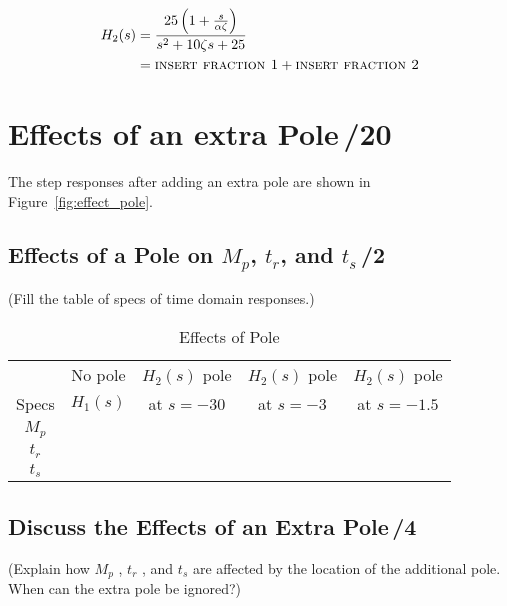 \documentclass{article}
\newcommand{\score}{\hfill \underline{\hspace{0.65cm}}\,/} %
\begin{document}
\begin{align*}
H_2(s) &=\frac{25 \left( 1+\frac{s}{\alpha \zeta} \right)}{s^2+10\zeta s +25}\\
       &= \mbox{\sc insert fraction 1} + \mbox{\sc insert fraction 2}
\end{align*}

\section{{\sc Effects of an extra Pole}\score 20}
The step responses after adding an extra pole are shown in Figure~\ref{fig:effect_pole}.

\subsection{Effects of a Pole on $M_p$, $t_r$, and $t_s$\score 2}
(Fill the table of specs of time domain responses.)
\begin{table}[phtb] \label{tbl:lab2_q3}
\begin{center}
\caption{Effects of Pole}
\begin{tabular}{c|c|c|c|c} \hline \hline
\rowcolor{Grey} & No pole & $H_2(s)$ pole & $H_2(s)$ pole & $H_2(s)$ pole \\
\rowcolor{Grey} Specs &  $H_1(s)$ &  at $s = -30$ &  at $s = -3$ & at $s = -1.5$ \\ \hline   
$M_p$ &  &  &  &  \\ \hline
$t_r$ &  &  &  &  \\ \hline
$t_s$ &  &  &  &  \\ \hline
\end{tabular}
\end{center}
\end{table}

\subsection{Discuss the Effects of an Extra Pole\score 4}
(Explain how $M_p$ , $t_r$ , and $t_s$ are affected by the location of the additional pole. When can the extra pole be ignored?)
\end{document}
